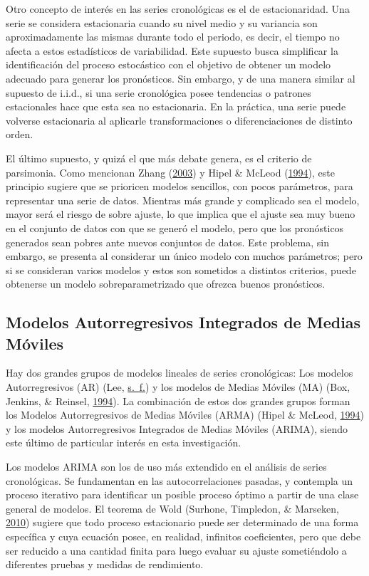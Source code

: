 \documentclass[
]{article}
\begin{document}
Otro concepto de interés en las series cronológicas es el de
estacionaridad. Una serie se considera estacionaria cuando su nivel
medio y su variancia son aproximadamente las mismas durante todo el
periodo, es decir, el tiempo no afecta a estos estadísticos de
variabilidad. Este supuesto busca simplificar la identificación del
proceso estocástico con el objetivo de obtener un modelo adecuado para
generar los pronósticos. Sin embargo, y de una manera similar al
supuesto de i.i.d., si una serie cronológica posee tendencias o patrones
estacionales hace que esta sea no estacionaria. En la práctica, una
serie puede volverse estacionaria al aplicarle transformaciones o
diferenciaciones de distinto orden.

El último supuesto, y quizá el que más debate genera, es el criterio de
parsimonia. Como mencionan Zhang (\protect\hyperlink{ref-Zhang}{2003}) y
Hipel \& McLeod (\protect\hyperlink{ref-Hipel}{1994}), este principio
sugiere que se prioricen modelos sencillos, con pocos parámetros, para
representar una serie de datos. Mientras más grande y complicado sea el
modelo, mayor será el riesgo de sobre ajuste, lo que implica que el
ajuste sea muy bueno en el conjunto de datos con que se generó el
modelo, pero que los pronósticos generados sean pobres ante nuevos
conjuntos de datos. Este problema, sin embargo, se presenta al
considerar un único modelo con muchos parámetros; pero si se consideran
varios modelos y estos son sometidos a distintos criterios, puede
obtenerse un modelo sobreparametrizado que ofrezca buenos pronósticos.

\subsection{Modelos Autorregresivos Integrados de Medias Móviles}

Hay dos grandes grupos de modelos lineales de series cronológicas: Los
modelos Autorregresivos (AR) (Lee, \protect\hyperlink{ref-Lee}{s.~f.}) y
los modelos de Medias Móviles (MA) (Box, Jenkins, \& Reinsel,
\protect\hyperlink{ref-box-jenkins}{1994}). La combinación de estos dos
grandes grupos forman los Modelos Autorregresivos de Medias Móviles
(ARMA) (Hipel \& McLeod, \protect\hyperlink{ref-Hipel}{1994}) y los
modelos Autorregresivos Integrados de Medias Móviles (ARIMA), siendo
este último de particular interés en esta investigación.

Los modelos ARIMA son los de uso más extendido en el análisis de series
cronológicas. Se fundamentan en las autocorrelaciones pasadas, y
contempla un proceso iterativo para identificar un posible proceso
óptimo a partir de una clase general de modelos. El teorema de Wold
(Surhone, Timpledon, \& Marseken, \protect\hyperlink{ref-Wold}{2010})
sugiere que todo proceso estacionario puede ser determinado de una forma
específica y cuya ecuación posee, en realidad, infinitos coeficientes,
pero que debe ser reducido a una cantidad finita para luego evaluar su
ajuste sometiéndolo a diferentes pruebas y medidas de rendimiento.
\end{document}
